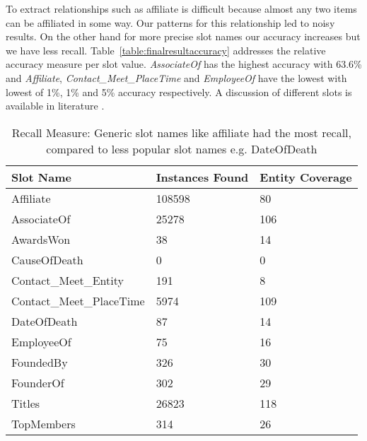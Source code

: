 To extract relationships such as affiliate is difficult because almost any
two items can be affiliated in some way.
Our patterns for this relationship led to noisy results.
On the other hand for more precise slot names our accuracy increases but we have less recall.
Table~\ref{table:finalresultaccuracy} addresses the relative accuracy measure per slot value.
\textit{AssociateOf} has the highest accuracy with 63.6\% and  \textit{Affiliate}, \textit{Contact\_Meet\_PlaceTime} and \textit{EmployeeOf} have the lowest with lowest of 1\%, 1\% and 5\% accuracy respectively.
A discussion of different slots is available in literature \cite{tackbp}.


\begin{table}
\caption{Recall Measure: Generic slot names like affiliate had the most recall, compared to less popular slot names e.g. DateOfDeath}
\centering
\label{table:finalresultrecall}
\begin{tabular}{|l|p{13mm}|p{22mm}|}
\hline 
 \textbf{Slot Name} & \textbf{Instances Found} & \textbf{Entity \hspace{5 mm} Coverage} \\ 
\hline 
Affiliate & 108598 & 80 \\ \hline 
AssociateOf & 25278 & 106 \\ \hline 
AwardsWon & 38 & 14 \\ \hline 
CauseOfDeath & 0 & 0 \\ \hline 
Contact\_Meet\_Entity & 191 & 8 \\ \hline 
Contact\_Meet\_PlaceTime & 5974 & 109 \\ \hline 
DateOfDeath & 87 & 14 \\ \hline 
EmployeeOf & 75 & 16 \\ \hline 
FoundedBy & 326 & 30 \\ \hline 
FounderOf & 302 &  29 \\ \hline 
Titles & 26823 & 118 \\ \hline 
TopMembers & 314 & 26 \\ \hline 

\end{tabular} 




\end{table}
